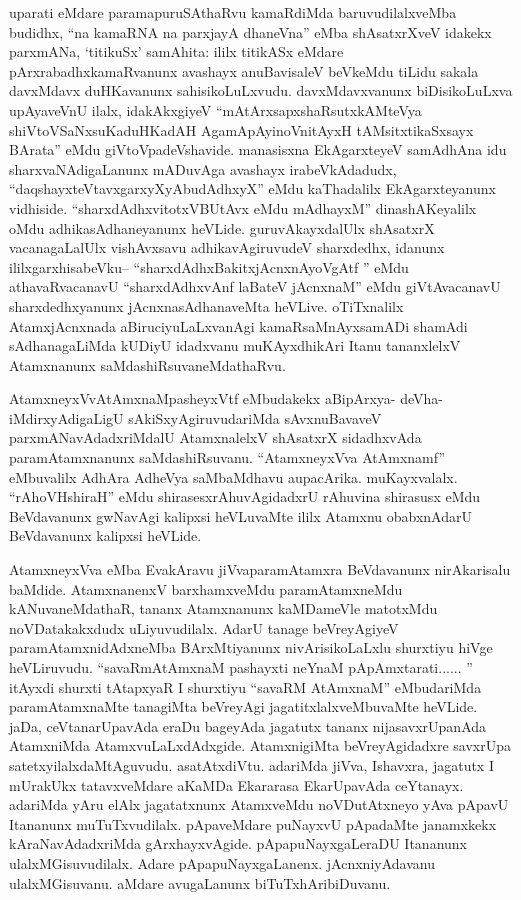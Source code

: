 \begin{artha}
uparati eMdare paramapuruSAthaRvu kamaRdiMda baruvudilalxveMba budidhx, ``na kamaRNA na parxjayA dhaneVna'' eMba shAsatxrXveV idakekx parxmANa, `titikuSx' samAhita: ililx titikASx eMdare pArxrabadhxkamaRvanunx avashayx anuBavisaleV beVkeMdu tiLidu sakala davxMdavx duHKavanunx sahisikoLuLxvudu. davxMdavxvanunx biDisikoLuLxva upAyaveVnU ilalx, idakAkxgiyeV ``mAtArxsapxshaRsutxkAMteVya shiVtoVSaNxsuKaduHKadAH AgamApAyinoV\s nitAyxH tAMsitxtikaSxsayx BArata'' eMdu giVtoVpadeVshavide. manasisxna EkAgarxteyeV samAdhAna idu sharxvaNAdigaLanunx mADuvAga avashayx irabeVkAdadudx, ``daqshayxteVtavxgarxyXyAbudAdhxyX'' eMdu kaThadalilx EkAgarxteyanunx vidhiside. ``sharxdAdhxvitotxVBUtAvx eMdu mAdhayxM'' dinashAKeyalilx oMdu adhikasAdhaneyanunx heVLide. guruvAkayxdalUlx shAsatxrX vacanagaLalUlx vishAvxsavu adhikavAgiruvudeV sharxdedhx, idanunx ililxgarxhisabeVku-- ``sharxdAdhxBakitxjAcnxnAyoVgAtf '' eMdu athavaRvacanavU ``sharxdAdhxvAnf laBateV jAcnxnaM'' eMdu giVtAvacanavU sharxdedhxyanunx jAcnxnasAdhanaveMta heVLive. oTiTxnalilx AtamxjAcnxnada aBiruciyuLaLxvanAgi kamaRsaMnAyxsamADi shamAdi sAdhanagaLiMda kUDiyU idadxvanu muKAyxdhikAri Itanu tananxlelxV Atamxnanunx saMdashiRsuvaneMdathaRvu.
\end{artha}

\begin{artha}
AtamxneyxVvAtAmxnaMpasheyxVtf eMbudakekx aBipArxya- deVha- iMdirxyAdigaLigU sAkiSxyAgiruvudariMda sAvxnuBavaveV parxmANavAdadxriMdalU AtamxnalelxV shAsatxrX sidadhxvAda paramAtamxnanunx saMdashiRsuvanu. ``AtamxneyxVva AtAmxnamf'' eMbuvalilx AdhAra AdheVya saMbaMdhavu aupacArika. muKayxvalalx. ``rAhoVHshiraH'' eMdu shirasesxrAhuvAgidadxrU rAhuvina shirasusx eMdu BeVdavanunx gwNavAgi kalipxsi heVLuvaMte ililx Atamxnu obabxnAdarU BeVdavanunx kalipxsi heVLide.
\end{artha}

\begin{artha}
AtamxneyxVva eMba EvakAravu jiVvaparamAtamxra BeVdavanunx nirAkarisalu baMdide. AtamxnanenxV barxhamxveMdu paramAtamxneMdu kANuvaneMdathaR, tananx Atamxnanunx kaMDameVle matotxMdu noVDatakakxdudx uLiyuvudilalx. AdarU tanage beVreyAgiyeV paramAtamxnidAdxneMba BArxMtiyanunx nivArisikoLaLxlu shurxtiyu hiVge heVLiruvudu. ``savaRmAtAmxnaM pashayxti neYnaM pApAmxtarati...... '' itAyxdi shurxti tAtapxyaR I shurxtiyu ``savaRM AtAmxnaM'' eMbudariMda paramAtamxnaMte tanagiMta beVreyAgi jagatitxlalxveMbuvaMte heVLide. jaDa, ceVtanarUpavAda eraDu bageyAda jagatutx tananx nijasavxrUpanAda AtamxniMda AtamxvuLaLxdAdxgide. AtamxnigiMta beVreyAgidadxre savxrUpa satetxyilalxdaMtAguvudu. asatAtxdiVtu. adariMda jiVva, Ishavxra, jagatutx I mUrakUkx tatavxveMdare aKaMDa Ekararasa EkarUpavAda ceYtanayx. adariMda yAru elAlx jagatatxnunx AtamxveMdu noVDutAtxneyo yAva pApavU Itananunx muTuTxvudilalx. pApaveMdare puNayxvU pApadaMte janamxkekx kAraNavAdadxriMda gArxhayxvAgide. pApapuNayxgaLeraDU Itananunx ulalxMGisuvudilalx. Adare pApapuNayxgaLanenx. jAcnxniyAdavanu ulalxMGisuvanu. aMdare avugaLanunx biTuTxhAribiDuvanu. 
\end{artha}

